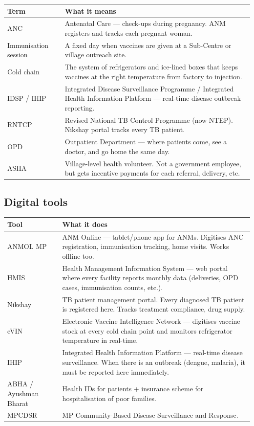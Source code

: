 \documentclass[11pt,a4paper]{article}
\begin{document}
\begin{tabularx}{\textwidth}{@{}L{3cm} X@{}}
\toprule
\textbf{Term} & \textbf{What it means} \\
\midrule
ANC & Antenatal Care --- check-ups during pregnancy. ANM registers and tracks each pregnant woman. \\
Immunisation session & A fixed day when vaccines are given at a Sub-Centre or village outreach site. \\
Cold chain & The system of refrigerators and ice-lined boxes that keeps vaccines at the right temperature from factory to injection. \\
IDSP / IHIP & Integrated Disease Surveillance Programme / Integrated Health Information Platform --- real-time disease outbreak reporting. \\
RNTCP & Revised National TB Control Programme (now NTEP). Nikshay portal tracks every TB patient. \\
OPD & Outpatient Department --- where patients come, see a doctor, and go home the same day. \\
ASHA & Village-level health volunteer. Not a government employee, but gets incentive payments for each referral, delivery, etc. \\
\bottomrule
\end{tabularx}

\subsection{Digital tools}

\begin{tabularx}{\textwidth}{@{}L{3.5cm} X@{}}
\toprule
\textbf{Tool} & \textbf{What it does} \\
\midrule
ANMOL MP & ANM Online --- tablet/phone app for ANMs. Digitises ANC registration, immunisation tracking, home visits. Works offline too. \\
HMIS & Health Management Information System --- web portal where every facility reports monthly data (deliveries, OPD cases, immunisation counts, etc.). \\
Nikshay & TB patient management portal. Every diagnosed TB patient is registered here. Tracks treatment compliance, drug supply. \\
eVIN & Electronic Vaccine Intelligence Network --- digitises vaccine stock at every cold chain point and monitors refrigerator temperature in real-time. \\
IHIP & Integrated Health Information Platform --- real-time disease surveillance. When there is an outbreak (dengue, malaria), it must be reported here immediately. \\
ABHA / Ayushman Bharat & Health IDs for patients + insurance scheme for hospitalisation of poor families. \\
MPCDSR & MP Community-Based Disease Surveillance and Response. \\
\bottomrule
\end{tabularx}
\end{document}
